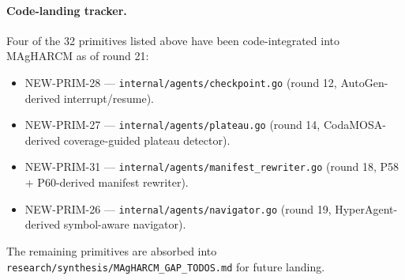 \paragraph{Code-landing tracker.}
Four of the 32 primitives listed above have been code-integrated into
MAgHARCM as of round 21:
\begin{itemize}
\item NEW-PRIM-28 --- \texttt{internal/agents/checkpoint.go} (round 12, AutoGen-derived interrupt/resume).
\item NEW-PRIM-27 --- \texttt{internal/agents/plateau.go} (round 14, CodaMOSA-derived coverage-guided plateau detector).
\item NEW-PRIM-31 --- \texttt{internal/agents/manifest\_rewriter.go} (round 18, P58 + P60-derived manifest rewriter).
\item NEW-PRIM-26 --- \texttt{internal/agents/navigator.go} (round 19, HyperAgent-derived symbol-aware navigator).
\end{itemize}
The remaining primitives are absorbed into \texttt{research/synthesis/MAgHARCM\_GAP\_TODOS.md} for future landing.
